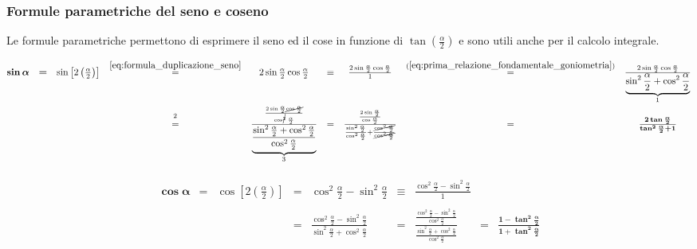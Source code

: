\subsubsection{Formule parametriche del seno e coseno}
Le formule parametriche permettono di esprimere il seno ed il cose in funzione di $\tan\left(\frac{\alpha}{2}\right)$ e sono utili anche per il calcolo integrale.
\begin{definition}
    \begin{equation}\label{eq:formula_parametrica_seno}
        \begin{matrix}
            \boldsymbol{\sin\alpha}&\boldsymbol =& \sin\left[2\left(\frac{\alpha}{2}\right)\right] &\overset{\ref{eq:formula_duplicazione_seno}}{=}& 2\sin\frac{\alpha}{2}\cos\frac{\alpha}{2}&\equiv&\frac{2\sin\frac{\alpha}{2}\cos\frac{\alpha}{2}}{1}&\overset{(\ref{eq:prima_relazione_fondamentale_goniometria})}{=}&\frac{2\sin\frac{\alpha}{2}\cos\frac{\alpha}{2}}{\underbrace{\sin^2\frac{\alpha}{2}+\cos^2\frac{\alpha}{2}}_{\footnotemark}} \\
            && &\overset{\footnotemark}{=}& \frac{\frac{2\sin\frac{\alpha}{2}\cancel{\cos\frac{\alpha}{2}}}{\cos^{\cancel{2}}\frac{\alpha}{2}}}{\underbrace{\frac{\sin^2\frac{\alpha}{2}+\cos^2\frac{\alpha}{2}}{\cos^2\frac{\alpha}{2}}}_{\footnotemark}}&=& \frac{\frac{2\sin\frac{\alpha}{2}}{\cos\frac{\alpha}{2}}}{\frac{\sin^2\frac{\alpha}{2}}{\cos^2\frac{\alpha}{2}}+\frac{\cancel{\cos^2\frac{\alpha}{2}}}{\cancel{\cos^2\frac{\alpha}{2}}}}&=& \boldsymbol{\frac{2\tan\frac{\alpha}{2}}{\tan^2\frac{\alpha}{2}+1}}
        \end{matrix}
    \end{equation}
\end{definition}

\begin{definition}
    \begin{equation}\label{eq:formula_parametrica_coseno}
        \begin{matrix}
            \boldsymbol{\cos\alpha} &=& \cos\left[2\left(\frac{\alpha}{2}\right)\right] &=& \cos^2\frac{\alpha}{2}-\sin^2\frac{\alpha}{2} &\equiv& \frac{\cos^2\frac{\alpha}{2}-\sin^2\frac{\alpha}{2}}{1} \\\\
            && &=& \frac{\cos^2\frac{\alpha}{2}-\sin^2\frac{\alpha}{2}}{\sin^2\frac{\alpha}{2}+\cos^2\frac{\alpha}{2}} &=& \frac{\frac{\cos^2\frac{\alpha}{2}-\sin^2\frac{\alpha}{2}}{\cos^2\frac{\alpha}{2}}}{\frac{\sin^2\frac{\alpha}{2}+\cos^2\frac{\alpha}{2}}{\cos^2\frac{\alpha}{2}}}&=&\boldsymbol{\frac{1-\tan^2\frac{\alpha}{2}}{1+\tan^2\frac{\alpha}{2}}}
        \end{matrix}
    \end{equation}
\end{definition}

